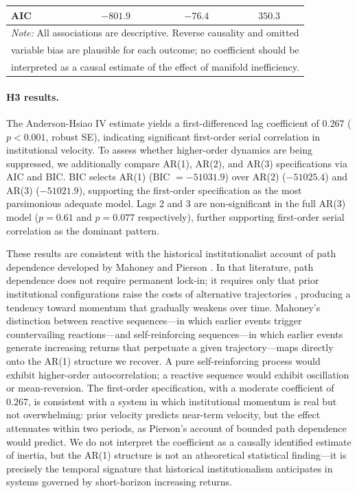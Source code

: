 \documentclass[12pt]{article}
\begin{document}
\begin{table}[htbp]
\begin{tabular}{lccc}
        AIC                 & $-801.9$        & $-76.4$                          & $350.3$                               \\
        \bottomrule
        \multicolumn{4}{l}{\footnotesize \textit{Note:} All associations are descriptive. Reverse causality and omitted} \\
        \multicolumn{4}{l}{\footnotesize variable bias are plausible for each outcome; no coefficient should be}         \\
        \multicolumn{4}{l}{\footnotesize interpreted as a causal estimate of the effect of manifold inefficiency.}       \\
    \end{tabular}
\end{table}

\paragraph{H3 results.} The Anderson-Hsiao IV estimate yields a first-differenced lag coefficient of $0.267$ ($p < 0.001$, robust SE), indicating significant first-order serial correlation in institutional velocity. To assess whether higher-order dynamics are being suppressed, we additionally compare AR(1), AR(2), and AR(3) specifications via AIC and BIC. BIC selects AR(1) (BIC $= -51031.9$) over AR(2) ($-51025.4$) and AR(3) ($-51021.9$), supporting the first-order specification as the most parsimonious adequate model. Lags 2 and 3 are non-significant in the full AR(3) model ($p = 0.61$ and $p = 0.077$ respectively), further supporting first-order serial correlation as the dominant pattern.

These results are consistent with the historical institutionalist account of path dependence developed by Mahoney and Pierson \cite{mahoney2000pathdependence, pierson2004politics}. In that literature, path dependence does not require permanent lock-in; it requires only that prior institutional configurations raise the costs of alternative trajectories \cite{north1990institutions}, producing a tendency toward momentum that gradually weakens over time. Mahoney's \cite{mahoney2000pathdependence} distinction between reactive sequences—in which earlier events trigger countervailing reactions—and self-reinforcing sequences—in which earlier events generate increasing returns that perpetuate a given trajectory—maps directly onto the AR(1) structure we recover. A pure self-reinforcing process would exhibit higher-order autocorrelation; a reactive sequence would exhibit oscillation or mean-reversion. The first-order specification, with a moderate coefficient of $0.267$, is consistent with a system in which institutional momentum is real but not overwhelming: prior velocity predicts near-term velocity, but the effect attenuates within two periods, as Pierson's \cite{pierson2004politics} account of bounded path dependence would predict. We do not interpret the coefficient as a causally identified estimate of inertia, but the AR(1) structure is not an atheoretical statistical finding—it is precisely the temporal signature that historical institutionalism anticipates in systems governed by short-horizon increasing returns.
\end{document}
